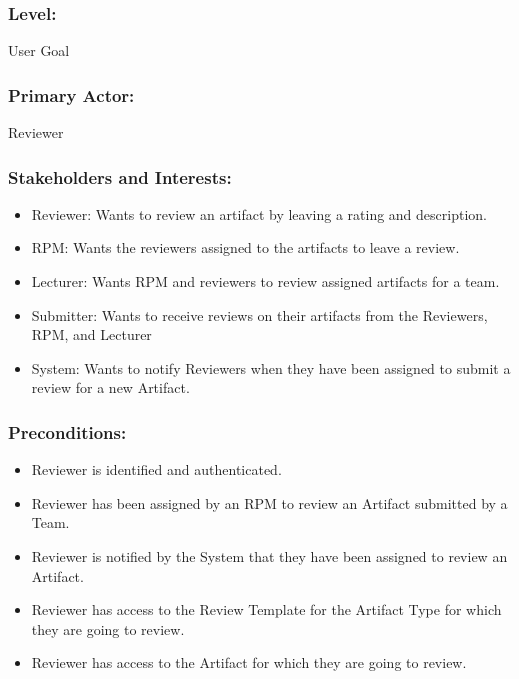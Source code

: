     \subsubsection*{\textbf{Level:} }User Goal
    \subsubsection*{\textbf{Primary Actor:} } Reviewer
    \subsubsection*{\textbf{Stakeholders and Interests:}}
    \begin{itemize}
    \itemsep-1em 
        \item Reviewer: Wants to review an artifact by leaving a rating and description.
        \item RPM: Wants the reviewers assigned to the artifacts to leave a review.
         \item Lecturer: Wants RPM and reviewers to review assigned artifacts for a team.
          \item Submitter: Wants to receive reviews on their artifacts from the Reviewers, RPM, and Lecturer
         \item System: Wants to notify Reviewers when they have been assigned to submit a
       review for a new Artifact.
    \end{itemize}
    
    
    \subsubsection*{\textbf{Preconditions:}}
    \begin{itemize}
    \itemsep-1em 
        \item Reviewer is identified and authenticated.
        \item Reviewer has been assigned by an RPM to review an Artifact submitted by a
        Team.
         \item Reviewer is notified by the System that they have been assigned to review an
          Artifact.
        \item Reviewer has access to the Review Template for the Artifact Type for which they are going to review.
        \item Reviewer has access to the Artifact for which they are going to review.
    \end{itemize}


